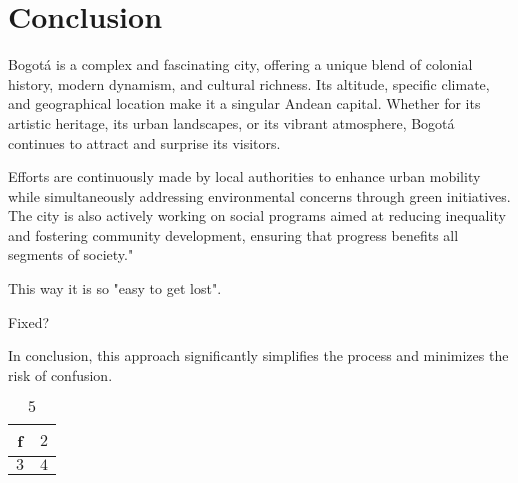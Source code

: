 \documentclass{article}
\begin{document}
\section{Conclusion}
Bogotá is a complex and fascinating city, offering a unique blend of colonial history, modern dynamism, and cultural richness. Its altitude, specific climate, and geographical location make it a singular Andean capital. Whether for its artistic heritage, its urban landscapes, or its vibrant atmosphere, Bogotá continues to attract and surprise its visitors.

Efforts are continuously made by local authorities to enhance urban mobility while simultaneously addressing environmental concerns through green initiatives. The city is also actively working on social programs aimed at reducing inequality and fostering community development, ensuring that progress benefits all segments of society."

This way it is so "easy to get lost".

Fixed?

In conclusion, this approach significantly simplifies the process and minimizes the risk of confusion.

\begin{table}[h!]
    \centering
    \begin{tabular}{|c|c|}
        \hline
        f & $2$ \\
        \hline
        $3$ & $4$ \\
        \hline
    \end{tabular}
    \caption{$5$}
    \label{tab:my_label}
\end{table}
\end{document}
